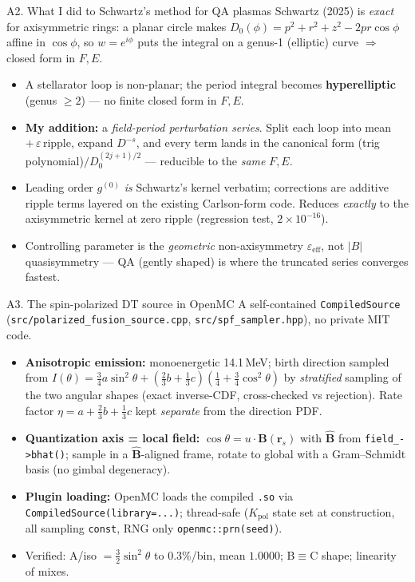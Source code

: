 \documentclass[aspectratio=169]{beamer}
\newcommand{\rs}{\bm{r}_s}
\newcommand{\Bhat}{\hat{\bm{B}}}
\newcommand{\eps}{\varepsilon}
\newcommand{\Kpol}{K_{\mathrm{pol}}}
\begin{document}
\begin{frame}{A2. What I did to Schwartz's method for QA plasmas}
  \small
  Schwartz (2025) is \emph{exact} for axisymmetric rings: a planar circle makes
  $D_0(\phi)=p^2+r^2+z^2-2pr\cos\phi$ affine in $\cos\phi$, so $w=e^{i\phi}$ puts the integral on a
  genus-1 (elliptic) curve $\Rightarrow$ closed form in $F,E$.
  \begin{itemize}
    \item A stellarator loop is non-planar; the period integral becomes \textbf{hyperelliptic}
      (genus $\ge 2$) --- no finite closed form in $F,E$.
    \item \textbf{My addition:} a \emph{field-period perturbation series}. Split each loop into mean
      $+\,\eps\,$ripple, expand $D^{-s}$, and every term lands in the canonical form
      (trig polynomial)$/D_0^{(2j+1)/2}$ --- reducible to the \emph{same} $F,E$.
    \item Leading order $g^{(0)}$ \emph{is} Schwartz's kernel verbatim; corrections are additive
      ripple terms layered on the existing Carlson-form code. Reduces \emph{exactly} to the
      axisymmetric kernel at zero ripple (regression test, $2\times10^{-16}$).
    \item Controlling parameter is the \emph{geometric} non-axisymmetry $\eps_{\mathrm{eff}}$, not
      $|B|$ quasisymmetry --- QA (gently shaped) is where the truncated series converges fastest.
  \end{itemize}
\end{frame}

\begin{frame}{A3. The spin-polarized DT source in OpenMC}
  \small
  A self-contained \texttt{CompiledSource} (\texttt{src/polarized\_fusion\_source.cpp},
  \texttt{src/spf\_sampler.hpp}), no private MIT code.
  \begin{itemize}
    \item \textbf{Anisotropic emission:} monoenergetic 14.1\,MeV; birth direction sampled from
      $I(\theta)=\tfrac34 a\sin^2\theta+(\tfrac23 b+\tfrac13 c)(\tfrac14+\tfrac34\cos^2\theta)$ by
      \emph{stratified} sampling of the two angular shapes (exact inverse-CDF, cross-checked vs
      rejection). Rate factor $\eta=a+\tfrac23 b+\tfrac13 c$ kept \emph{separate} from the
      direction PDF.
    \item \textbf{Quantization axis = local field:} $\cos\theta=u\cdot\Bhat(\rs)$ with $\Bhat$ from
      \texttt{field\_->bhat()}; sample in a $\Bhat$-aligned frame, rotate to global with a
      Gram--Schmidt basis (no gimbal degeneracy).
    \item \textbf{Plugin loading:} OpenMC loads the compiled \texttt{.so} via
      \texttt{CompiledSource(library=...)}; thread-safe ($\Kpol$ state set at construction, all
      sampling \texttt{const}, RNG only \texttt{openmc::prn(seed)}).
    \item Verified: A/iso $=\tfrac32\sin^2\theta$ to 0.3\%/bin, mean $1.0000$; B$\equiv$C shape;
      linearity of mixes.
  \end{itemize}
\end{frame}
\end{document}
